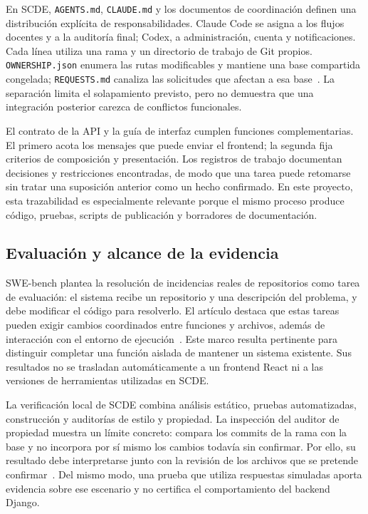En SCDE, \texttt{AGENTS.md}, \texttt{CLAUDE.md} y los documentos de coordinación
definen una distribución explícita de responsabilidades. Claude Code se asigna
a los flujos docentes y a la auditoría final; Codex, a administración, cuenta y
notificaciones. Cada línea utiliza una rama y un directorio de trabajo de Git
propios. \texttt{OWNERSHIP.json} enumera las rutas modificables y mantiene una
base compartida congelada; \texttt{REQUESTS.md} canaliza las solicitudes que
afectan a esa base~\cite{codex_scde_agent_evidence}. La separación limita el
solapamiento previsto, pero no demuestra que una integración posterior carezca
de conflictos funcionales.

El contrato de la API y la guía de interfaz cumplen funciones complementarias.
El primero acota los mensajes que puede enviar el frontend; la segunda fija
criterios de composición y presentación. Los registros de trabajo documentan
decisiones y restricciones encontradas, de modo que una tarea puede retomarse
sin tratar una suposición anterior como un hecho confirmado. En este proyecto,
esta trazabilidad es especialmente relevante porque el mismo proceso produce
código, pruebas, scripts de publicación y borradores de documentación.

\subsection{Evaluación y alcance de la evidencia}

SWE-bench plantea la resolución de incidencias reales de repositorios como tarea
de evaluación: el sistema recibe un repositorio y una descripción del problema,
y debe modificar el código para resolverlo. El artículo destaca que estas tareas
pueden exigir cambios coordinados entre funciones y archivos, además de
interacción con el entorno de ejecución~\cite{codex_swebench_2024}. Este marco
resulta pertinente para distinguir completar una función aislada de mantener un
sistema existente. Sus resultados no se trasladan automáticamente a un frontend
React ni a las versiones de herramientas utilizadas en SCDE.

La verificación local de SCDE combina análisis estático, pruebas automatizadas,
construcción y auditorías de estilo y propiedad. La inspección del auditor de
propiedad muestra un límite concreto: compara los commits de la rama con la
base y no incorpora por sí mismo los cambios todavía sin confirmar. Por ello,
su resultado debe interpretarse junto con la revisión de los archivos que se
pretende confirmar~\cite{codex_scde_agent_evidence}. Del mismo modo, una prueba
que utiliza respuestas simuladas aporta evidencia sobre ese escenario y no
certifica el comportamiento del backend Django.

